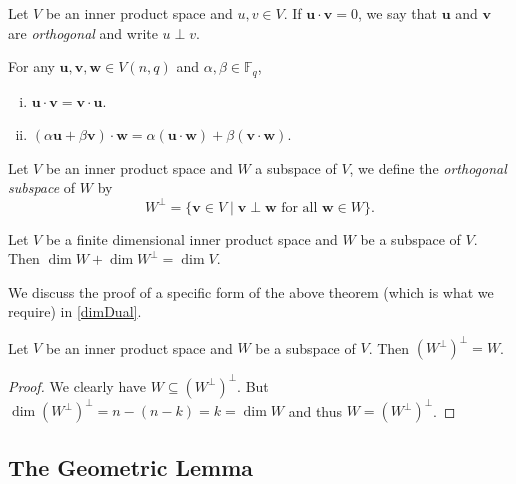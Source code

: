 \begin{definition}
    Let $V$ be an inner product space and $u,v\in V$. If $\textbf{u}\cdot \textbf{v}=0$, we say that $\textbf{u}$ and $\textbf{v}$ are \textit{orthogonal} and write $u\perp v$.
\end{definition}

\begin{lemma}
    For any $\textbf{u},\textbf{v},\textbf{w}\in V(n,q)$ and $\alpha,\beta\in\mathbb{F}_q$,
    \begin{enumerate}[(i)]
        \item $\textbf{u}\cdot \textbf{v}=\textbf{v}\cdot \textbf{u}$.
        \item $(\alpha\textbf{u}+\beta\textbf{v})\cdot\textbf{w}=\alpha(\textbf{u}\cdot\textbf{w})+\beta(\textbf{v}\cdot\textbf{w})$.
    \end{enumerate}
\end{lemma}

\begin{definition}
    Let $V$ be an inner product space and $W$ a subspace of $V$, we define the \textit{orthogonal subspace} of $W$ by
    $$W^\perp=\{\textbf{v}\in V\mid\textbf{v}\perp\textbf{w}\text{ for all }\textbf{w}\in W\}.$$
\end{definition}

\begin{theorem}
    Let $V$ be a finite dimensional inner product space and $W$ be a subspace of $V$. Then $\dim W+\dim W^\perp = \dim V$.
\end{theorem}

We discuss the proof of a specific form of the above theorem (which is what we require) in \ref{dimDual}.

\begin{theorem}
    Let $V$ be an inner product space and $W$ be a subspace of $V$. Then $(W^\perp)^\perp=W$.
\end{theorem}
\begin{proof}
    We clearly have $W\subseteq (W^\perp)^\perp$. But $\dim (W^\perp)^\perp=n-(n-k)=k=\dim W$ and thus $W=(W^\perp)^\perp$.
\end{proof}

\subsection{The Geometric Lemma}

